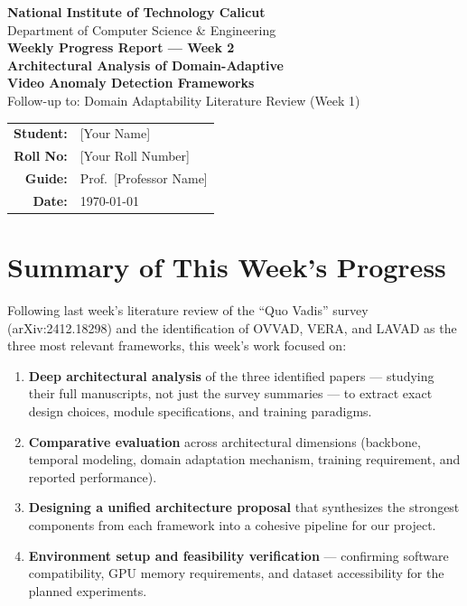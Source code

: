 \documentclass[12pt, a4paper]{article}
\begin{document}
\begin{center}
    {\large \textbf{National Institute of Technology Calicut}}\\[0.3cm]
    {\normalsize Department of Computer Science \& Engineering}\\[1.5cm]
    
    {\Large \textbf{Weekly Progress Report --- Week 2}}\\[0.8cm]
    
    {\LARGE \textbf{Architectural Analysis of Domain-Adaptive\\[0.3cm] Video Anomaly Detection Frameworks}}\\[1.5cm]
    
    {\large Follow-up to: Domain Adaptability Literature Review (Week 1)}\\[1.5cm]
    
    \begin{tabular}{rl}
        \textbf{Student:} & [Your Name] \\
        \textbf{Roll No:} & [Your Roll Number] \\
        \textbf{Guide:} & Prof.\ [Professor Name] \\
        \textbf{Date:} & \today \\
    \end{tabular}
\end{center}

\newpage

\section{Summary of This Week's Progress}

Following last week's literature review of the ``Quo Vadis'' survey (arXiv:2412.18298) and the identification of OVVAD, VERA, and LAVAD as the three most relevant frameworks, this week's work focused on:

\begin{enumerate}[leftmargin=*]
    \item \textbf{Deep architectural analysis} of the three identified papers --- studying their full manuscripts, not just the survey summaries --- to extract exact design choices, module specifications, and training paradigms.
    \item \textbf{Comparative evaluation} across architectural dimensions (backbone, temporal modeling, domain adaptation mechanism, training requirement, and reported performance).
    \item \textbf{Designing a unified architecture proposal} that synthesizes the strongest components from each framework into a cohesive pipeline for our project.
    \item \textbf{Environment setup and feasibility verification} --- confirming software compatibility, GPU memory requirements, and dataset accessibility for the planned experiments.
\end{enumerate}
\end{document}
